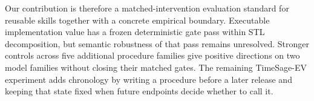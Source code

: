Our contribution is therefore a matched-intervention evaluation standard for reusable skills together with a concrete empirical boundary. Executable implementation value has a frozen deterministic gate pass within STL decomposition, but semantic robustness of that pass remains unresolved. Stronger controls across five additional procedure families give positive directions on two model families without closing their matched gates. The remaining TimeSage-EV experiment adds chronology by writing a procedure before a later release and keeping that state fixed when future endpoints decide whether to call it.
